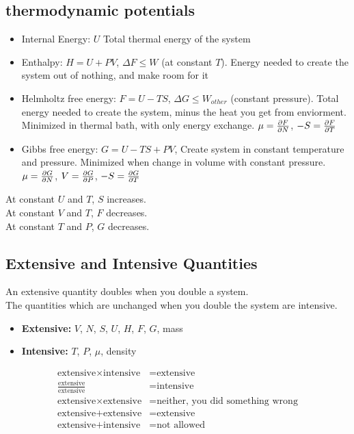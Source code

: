 \documentclass[a4paper, norsk, 8pt]{article}
\begin{document}
\begin{multicols*}{3}
\subsection*{\footnotesize  thermodynamic potentials}

\begin{itemize}
    \item Internal Energy: $U$    Total thermal energy of the system
    \item Enthalpy: $H=U+PV$,  $\Delta F \leq W$ (at constant $T$). Energy needed to create the system out of nothing, and make room for it
    \item Helmholtz free energy: $F=U-TS$,  $\Delta G \leq W_{other}$ (constant pressure). Total energy needed to create the system, minus the heat you get from enviorment. Minimized in thermal bath, with only energy exchange. $\mu=\pdv{F}{N}$, $-S=\pdv{F}{T}$
    \item  Gibbs free energy: $G=U-TS+PV$, Create system in constant temperature and pressure. Minimized when change in volume with constant pressure. $\mu=\pdv{G}{N}$, $V = \pdv{G}{P}$, $-S=\pdv{G}{T}$
\end{itemize}
At constant $U$ and $T$, $S$ increases.\\
At constant $V$ and $T$, $F$ decreases.\\
At constant $T$ and $P$, $G$ decreases.\\

\subsection*{\footnotesize  Extensive and Intensive Quantities}
An extensive quantity doubles when you double a system.\\
The quantities which are unchanged when you double the system are intensive.
\begin{itemize}
    \item \textbf{Extensive:} $V$, $N$, $S$, $U$, $H$, $F$, $G$, mass
    \item \textbf{Intensive:} $T$, $P$, $\mu$, density
\end{itemize}
\begin{align*}
    \text{extensive} \times \text{intensive} &= \text{extensive} \\
     \frac{\text{extensive}}{\text{extensive}} &= \text{intensive} \\
     \text{extensive} \times \text{extensive} &= \text{neither, you did something wrong} \\
     \text{extensive} + \text{extensive} &= \text{extensive} \\
     \text{extensive} + \text{intensive} &= \text{not allowed}
\end{align*}



\end{multicols*}
\end{document}
